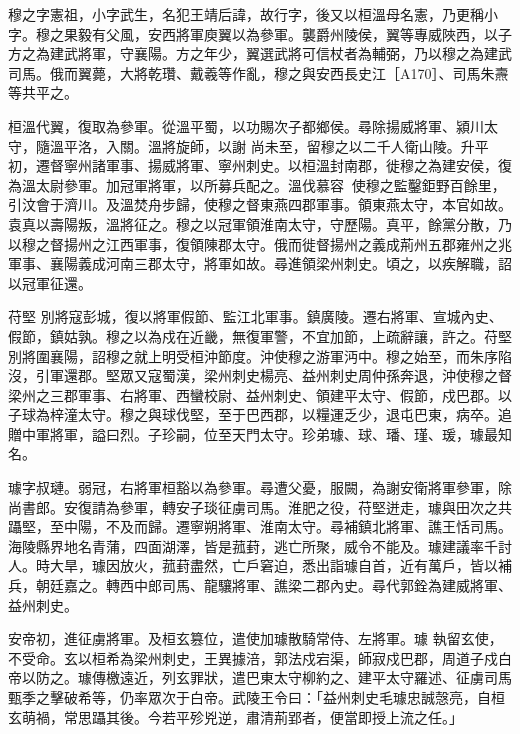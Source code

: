 \begin{pinyinscope}
 穆之字憲祖，小字武生，名犯王靖后諱，故行字，後又以桓溫母名憲，乃更稱小字。穆之果毅有父風，安西將軍庾翼以為參軍。襲爵州陵侯，翼等專威陜西，以子方之為建武將軍，守襄陽。方之年少，翼選武將可信杖者為輔弼，乃以穆之為建武司馬。俄而翼薨，大將乾瓚、戴羲等作亂，穆之與安西長史江［A170］、司馬朱燾等共平之。



 桓溫代翼，復取為參軍。從溫平蜀，以功賜次子都鄉侯。尋除揚威將軍、潁川太守，隨溫平洛，入關。溫將旋師，以謝
 尚未至，留穆之以二千人衛山陵。升平初，遷督寧州諸軍事、揚威將軍、寧州刺史。以桓溫封南郡，徙穆之為建安侯，復為溫太尉參軍。加冠軍將軍，以所募兵配之。溫伐慕容，使穆之監鑿鉅野百餘里，引汶會于濟川。及溫焚舟步歸，使穆之督東燕四郡軍事。領東燕太守，本官如故。袁真以壽陽叛，溫將征之。穆之以冠軍領淮南太守，守歷陽。真平，餘黨分散，乃以穆之督揚州之江西軍事，復領陳郡太守。俄而徙督揚州之義成荊州五郡雍州之兆軍事、襄陽義成河南三郡太守，將軍如故。尋進領梁州刺史。頃之，以疾解職，詔以冠軍征還。



 苻堅
 別將寇彭城，復以將軍假節、監江北軍事。鎮廣陵。遷右將軍、宣城內史、假節，鎮姑孰。穆之以為戍在近畿，無復軍警，不宜加節，上疏辭讓，許之。苻堅別將圍襄陽，詔穆之就上明受桓沖節度。沖使穆之游軍沔中。穆之始至，而朱序陷沒，引軍還郡。堅眾又寇蜀漢，梁州刺史楊亮、益州刺史周仲孫奔退，沖使穆之督梁州之三郡軍事、右將軍、西蠻校尉、益州刺史、領建平太守、假節，戍巴郡。以子球為梓潼太守。穆之與球伐堅，至于巴西郡，以糧運乏少，退屯巴東，病卒。追贈中軍將軍，謚曰烈。子珍嗣，位至天門太守。珍弟璩、球、璠、瑾、瑗，璩最知名。



 璩字叔璉。弱冠，右將軍桓豁以為參軍。尋遭父憂，服闕，為謝安衛將軍參軍，除尚書郎。安復請為參軍，轉安子琰征虜司馬。淮肥之役，苻堅迸走，璩與田次之共躡堅，至中陽，不及而歸。遷寧朔將軍、淮南太守。尋補鎮北將軍、譙王恬司馬。海陵縣界地名青蒲，四面湖澤，皆是菰葑，逃亡所聚，威令不能及。璩建議率千討人。時大旱，璩因放火，菰葑盡然，亡戶窘迫，悉出詣璩自首，近有萬戶，皆以補兵，朝廷嘉之。轉西中郎司馬、龍驤將軍、譙梁二郡內史。尋代郭銓為建威將軍、益州刺史。



 安帝初，進征虜將軍。及桓玄篡位，遣使加璩散騎常侍、左將軍。璩
 執留玄使，不受命。玄以桓希為梁州刺史，王異據涪，郭法戍宕渠，師寂戍巴郡，周道子戍白帝以防之。璩傳檄遠近，列玄罪狀，遣巴東太守柳約之、建平太守羅述、征虜司馬甄季之擊破希等，仍率眾次于白帝。武陵王令曰：「益州刺史毛璩忠誠愨亮，自桓玄萌禍，常思躡其後。今若平殄兇逆，肅清荊郢者，便當即授上流之任。」




\end{pinyinscope}
